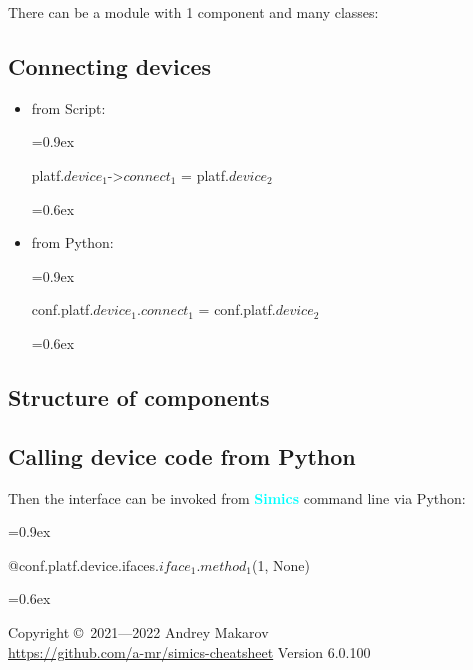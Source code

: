 \documentclass[8pt]{extarticle}
\newenvironment{code}[1][]{%
\begin{prebox}[#1]\obeylines%
\fontdimen2\font=0.9ex%
}{%
\end{prebox}%
\fontdimen2\font=0.6ex%
}
\newcommand{\p}[1]{\textit{\large#1}}
\newcommand{\Simics}{\textcolor{cyan}{\textbf{Simics}}}
\begin{document}
\begin{multicols*}{3}

There can be a module with 1 component and many classes:


\subsection{Connecting devices}
  \begin{itemize}
      \item from Script:
          \begin{code}
              platf.$device_1$->$connect_1$ = platf.$device_2$
          \end{code}
      \item from Python:
          \begin{code}
              conf.platf.$device_1$.$connect_1$ = conf.platf.$device_2$
          \end{code}
  \end{itemize}

\subsection{Structure of components}

\subsection{Calling device code from Python}

Then the interface can be invoked from \Simics{} command line via Python:
\begin{code}
    @conf.platf.device.ifaces.$iface_1$.$method_1$(1, None)
\end{code}

Copyright \copyright\ 2021—2022 Andrey Makarov \\
\href{https://github.com/a-mr/simics-cheatsheet}{https://github.com/a-mr/simics-cheatsheet}
Version 6.0.100

\end{multicols*}
\end{document}
